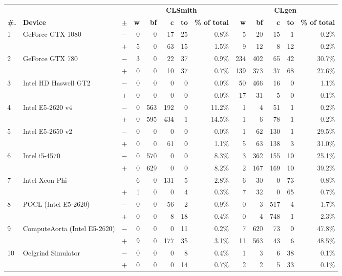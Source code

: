   \begin{tabular}{lll | rrrrr | rrrrr }
  \toprule
  & & & \multicolumn{5}{c|}{\textbf{CLSmith}} & \multicolumn{5}{c}{\textbf{CLgen}} \\
  \textbf{\#.} & \textbf{Device} & $\pm$ &
  \textbf{w} & \textbf{bf} & \textbf{c} & \textbf{to} & \textbf{\% of total} &
  \textbf{w} & \textbf{bf} & \textbf{c} & \textbf{to} & \textbf{\% of total} \\
  \midrule
  \multirow{ 2}{*}{1} & \multirow{ 2}{*}{GeForce GTX 1080} & $-$ & 0 & 0 & 17 & 25 & 0.8\%       & 5 & 20 & 15 & 1 & 0.2\% \\& & $+$ & 5 & 0 & 63 & 15 & 1.5\% & 9 & 12 & 8 & 12 & 0.2\% \\
\hline
\multirow{ 2}{*}{2} & \multirow{ 2}{*}{GeForce GTX 780} & $-$ & 3 & 0 & 22 & 37 & 0.9\%       & 234 & 402 & 65 & 42 & 30.7\% \\& & $+$ & 0 & 0 & 10 & 37 & 0.7\% & 139 & 373 & 37 & 68 & 27.6\% \\
\hline
\multirow{ 2}{*}{3} & \multirow{ 2}{*}{Intel HD Haswell GT2} & $-$ & 0 & 0 & 0 & 0 & 0.0\%       & 50 & 466 & 16 & 0 & 1.1\% \\& & $+$ & 0 & 0 & 0 & 0 & 0.0\% & 17 & 31 & 5 & 0 & 0.1\% \\
\hline
\multirow{ 2}{*}{4} & \multirow{ 2}{*}{Intel E5-2620 v4} & $-$ & 0 & 563 & 192 & 0 & 11.2\%       & 1 & 4 & 51 & 1 & 0.2\% \\& & $+$ & 0 & 595 & 434 & 1 & 14.5\% & 1 & 6 & 78 & 1 & 0.2\% \\
\hline
\multirow{ 2}{*}{5} & \multirow{ 2}{*}{Intel E5-2650 v2} & $-$ & 0 & 0 & 0 & 0 & 0.0\%       & 1 & 62 & 130 & 1 & 29.5\% \\& & $+$ & 0 & 0 & 61 & 0 & 1.1\% & 5 & 63 & 138 & 3 & 31.0\% \\
\hline
\multirow{ 2}{*}{6} & \multirow{ 2}{*}{Intel i5-4570} & $-$ & 0 & 570 & 0 & 0 & 8.3\%       & 3 & 362 & 155 & 10 & 25.1\% \\& & $+$ & 0 & 629 & 0 & 0 & 8.2\% & 2 & 167 & 169 & 10 & 39.2\% \\
\hline
\multirow{ 2}{*}{7} & \multirow{ 2}{*}{Intel Xeon Phi} & $-$ & 6 & 0 & 131 & 5 & 2.8\%       & 6 & 30 & 0 & 73 & 0.8\% \\& & $+$ & 1 & 0 & 0 & 4 & 0.3\% & 7 & 32 & 0 & 65 & 0.7\% \\
\hline
\multirow{ 2}{*}{8} & \multirow{ 2}{*}{POCL (Intel E5-2620)} & $-$ & 0 & 0 & 56 & 2 & 0.9\%       & 0 & 3 & 517 & 4 & 1.7\% \\& & $+$ & 0 & 0 & 8 & 18 & 0.4\% & 0 & 4 & 748 & 1 & 2.3\% \\
\hline
\multirow{ 2}{*}{9} & \multirow{ 2}{*}{ComputeAorta (Intel E5-2620)} & $-$ & 0 & 0 & 0 & 11 & 0.2\%       & 7 & 620 & 73 & 0 & 47.8\% \\& & $+$ & 9 & 0 & 177 & 35 & 3.1\% & 11 & 563 & 43 & 6 & 48.5\% \\
\hline
\multirow{ 2}{*}{10} & \multirow{ 2}{*}{Oclgrind Simulator} & $-$ & 0 & 0 & 0 & 8 & 0.4\%       & 1 & 3 & 6 & 38 & 0.1\% \\& & $+$ & 0 & 0 & 0 & 14 & 0.7\% & 2 & 2 & 5 & 33 & 0.1\% \\
  \bottomrule
\end{tabular}

